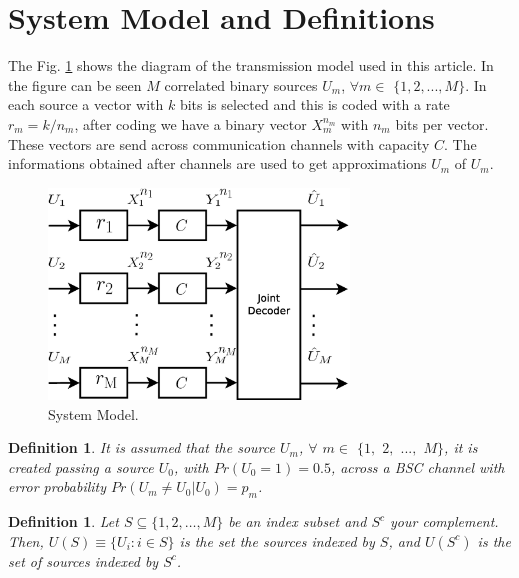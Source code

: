 \documentclass[journal]{IEEEtran}
\newtheorem{definition}[theorem]{Definition}
\begin{document}
\section{System Model and Definitions} 
\label{sec:SystemModel}



The Fig. \ref{fig:modelo} shows the diagram of the transmission model used in this 
article. In the figure can be seen $M$ correlated binary sources $U_m$, $\forall m \in$ 
$\{1, 2, ..., M\}$. In each source a vector with $k$ bits is selected and this 
 is coded with a rate  $r_m=k/n_m$, after coding we have a binary 
vector $X_{m}^{n_m}$ with $n_m$ bits per vector. These vectors are send across
communication channels with capacity $C$. The informations obtained after channels 
are used to get approximations $\hat{U}_m$ of $U_m$.


\begin{figure}[h!bt]
\centering
\includegraphics[width=8.0cm]{pujaico1.eps}
\caption{System Model.} \label{fig:modelo}
\end{figure}

\begin{definition}
 It is assumed that the source 
$U_m$, $\forall$ $m \in$ $\{1,$ $2,$ $...,$ $M\}$, it is created 
passing a source $U_0$, with $Pr(U_0=1)=0.5$, across a BSC channel  with error 
probability $Pr(U_m \ne U_0 | U_0)=p_m$.
\end{definition}

\begin{definition}
\label{def:US} 
Let $S \subseteq \{1, 2, \ldots, M\}$ be an index subset and $S^c$  your complement.
Then, $U(S)\equiv \{U_i: i \in S\}$ is the set the sources indexed by $S$, and $U(S^c)$ is the set
of sources indexed by $S^c$. 


\end{definition}
\end{document}
